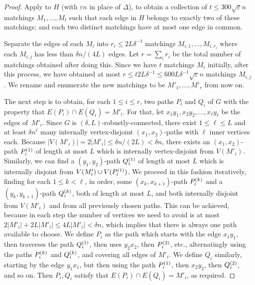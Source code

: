 \documentclass[a4paper, 11pt,reqno]{amsart}
\theoremstyle{plain}
\theoremstyle{definition}
\numberwithin{equation}{section}
\newcommand{\eps}{\varepsilon}
\begin{document}
\begin{proof}
  Apply  to $H$ (with $\eps n$ in place of $\Delta$), to obtain a collection
  of $t \leq 300 \sqrt{\eps} n$ matchings $M_1, \dotsc, M_t$ such that
  each edge in $H$ belongs to exactly two of these matchings; and
  each two distinct matchings have at most one edge in common.
  
  Separate the edges of each $M_i$ into $r_i \leq 2L \delta^{-1}$
  matchings $M_{i, 1}, \dotsc, M_{i, r_i}$ where each $M_{i, j}$ has
  less than $\delta n / (4 L)$ edges.  Let $r = \sum_i r_i$ be the total
  number of matchings obtained after doing this.  Since we have $t$
  matchings $M_i$ initially, after this process, we have obtained at
  most $r \leq t 2 L \delta^{-1} \leq 600 L \delta^{-1} \sqrt{\eps} n$
  matchings $M_{i, j}$.  We rename and enumerate the new matchings to
  be $M'_1, \dotsc, M'_r$ from now on.
  
  The next step is to obtain, for each $1 \leq i \leq r$, two paths
  $P_i$ and $Q_i$ of $G$ with the property that $E(P_i) \cap E(Q_i) = M'_i$. 
  For that, let $x_1 y_1, x_2 y_2, \dotsc, x_\ell y_\ell$ be the edges of~$M'_i$. 
  Since $G$ is $(\delta, L)$-robustly-connected, 
  there exist $1 \leq \ell \leq L$ and at least $\delta n^\ell$ many internally 
  vertex-disjoint $(x_1, x_2)$-paths with $\ell$ inner vertices each.  
  Because $|V(M'_i)| = 2 |M'_i| \leq \delta n / (2 L) < \delta n$, 
  there exists an $(x_1, x_2)$-path $P^{\smash{(1)}}_i$ of length at most $L$ 
  which is internally vertex-disjoint from $V(M'_i)$.  
  Similarly, we can find a $(y_1, y_2)$-path $Q^{\smash{(1)}}_i$ of length 
  at most $L$ which is internally disjoint from $V(M'_i) \cup V(P^{\smash{(1)}}_i)$.  
  We proceed in this fashion iteratively, finding for each $1 \leq k < \ell$, 
  in order, some $(x_k, x_{k+1})$-path $P^{\smash{(k)}}_i$ and a $(y_k, y_{k+1})$-path 
  $Q^{\smash{(k)}}_i$, both of length at most $L$, and both internally disjoint 
  from $V(M'_i)$ and from all previously chosen paths.  
  This can be achieved, because in each step the number of vertices we need 
  to avoid is at most $2 |M'_i| + 2 L |M'_i| \leq 4 L |M'_i| < \delta n$, 
  which implies that there is always one path available to choose.  
  We define $P_i$ as the path which starts with the edge $x_1y_1$, 
  then traverses the path $Q^{\smash{(1)}}_i$, then uses $y_2 x_2$, 
  then $P^{\smash{(2)}}_i$, etc., alternatingly using the paths $P^{\smash{(k)}}_i$ 
  and $Q^{\smash{(k)}}_i$, and covering all edges of $M'_i$.  
  We define $Q_i$ similarly, starting by the edge $y_1 x_1$, but then using the path $P^{\smash{(1)}}_i$, then $x_2 y_2$,
  then $Q^{\smash{(2)}}_i$, and so on.  
  Then $P_i, Q_i$ satisfy that $E(P_i) \cap E(Q_i) = M'_i$, as required.
  

\end{proof}
\end{document}
